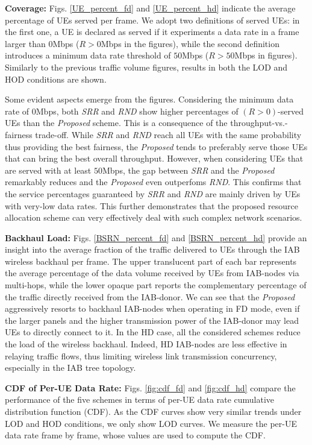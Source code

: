 \textbf{Coverage:}
Figs. \ref{UE_percent_fd} and \ref{UE_percent_hd} indicate the average percentage of UEs served per frame. We adopt two definitions of served UEs: in the first one, a UE is declared as served if it experiments a data rate in a frame larger than $0$Mbps ($R>0$Mbps in the figures), while the second definition introduces a minimum data rate threshold of $50$Mbps ($R>50$Mbps in figures). Similarly to the previous traffic volume figures, results in both the LOD and HOD conditions are shown.

Some evident aspects emerge from the figures. Considering the minimum data rate of $0$Mbps, both \textit{SRR} and \textit{RND} show higher percentages of $(R>0)$-served UEs than the \textit{Proposed} scheme. This is a consequence of the throughput-vs.-fairness trade-off. While \textit{SRR} and \textit{RND} reach all UEs with the same probability thus providing the best fairness, the \textit{Proposed} tends to preferably serve those UEs that can bring the best overall throughput. However, when considering UEs that are served with at least $50$Mbps, the gap between \textit{SRR} and the \textit{Proposed} remarkably reduces and the \textit{Proposed} even outperfoms \textit{RND}. This confirms that the service percentages guaranteed by \textit{SRR} and \textit{RND} are mainly driven by UEs with very-low data rates. This further demonstrates that the proposed resource allocation scheme can very effectively deal with such complex network scenarios.

\textbf{Backhaul Load:}
Figs. \ref{BSRN_percent_fd} and \ref{BSRN_percent_hd} provide an insight into the average fraction of the traffic delivered to UEs through the IAB wireless backhaul per frame. The upper translucent part of each bar represents the average percentage of the data volume received by UEs from IAB-nodes via multi-hops, while the lower opaque part reports the complementary percentage of the traffic directly received from the IAB-donor. We can see that the \textit{Proposed} aggressively resorts to backhaul IAB-nodes when operating in FD mode, even if the larger panels and the higher transmission power of the IAB-donor may lead UEs to directly connect to it. In the HD case, all the considered schemes reduce the load of the wireless backhaul. Indeed, HD IAB-nodes are less effective in relaying traffic flows, thus limiting wireless link transmission concurrency, especially in the IAB tree topology.

\textbf{CDF of Per-UE Data Rate:}
Figs. \ref{fig:cdf_fd} and \ref{fig:cdf_hd} compare the performance of the five schemes in terms of per-UE data rate cumulative distribution function (CDF). As the CDF curves show very similar trends under LOD and HOD conditions, we only show LOD curves. We measure the per-UE data rate frame by frame, whose values are used to compute the CDF.

